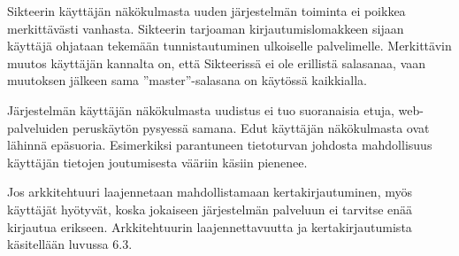 Sikteerin käyttäjän näkökulmasta uuden järjestelmän toiminta ei poikkea merkittävästi vanhasta. Sikteerin tarjoaman kirjautumislomakkeen sijaan käyttäjä ohjataan tekemään tunnistautuminen ulkoiselle palvelimelle. Merkittävin muutos käyttäjän kannalta on, että Sikteerissä ei ole erillistä salasanaa, vaan muutoksen jälkeen sama ''master''-salasana on käytössä kaikkialla.

Järjestelmän käyttäjän näkökulmasta uudistus ei tuo suoranaisia etuja, web-pal\-ve\-lui\-den peruskäytön pysyessä samana. Edut käyttäjän näkökulmasta ovat lähinnä epäsuoria. Esimerkiksi parantuneen tietoturvan johdosta mahdollisuus käyttäjän tietojen joutumisesta vääriin käsiin pienenee.

Jos arkkitehtuuri laajennetaan mahdollistamaan kertakirjautuminen, myös käyttäjät hyötyvät, koska jokaiseen järjestelmän palveluun ei tarvitse enää kirjautua erikseen. Arkkitehtuurin laajennettavuutta ja kertakirjautumista käsitellään luvussa 6.3.